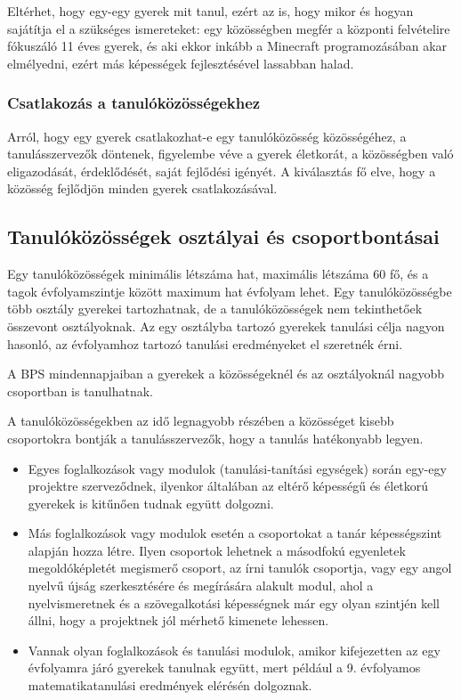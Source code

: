 Eltérhet, hogy egy-egy gyerek mit tanul, ezért az is, hogy mikor és
hogyan sajátítja el a szükséges ismereteket: egy közösségben megfér a
központi felvételire fókuszáló 11 éves gyerek, és aki ekkor inkább a
Mi\-ne\-craft programozásában akar elmélyedni, ezért más képességek
fejlesztésével lassabban halad.

\hypertarget{csatlakozas-a-tanulokozossegekhez}{%
\subsubsection{Csatlakozás a
tanulóközösségekhez}\label{csatlakozas-a-tanulokozossegekhez}}

Arról, hogy egy gyerek csatlakozhat-e egy tanulóközösség közösségéhez, a
tanulásszervezők döntenek, figyelembe véve a gyerek életkorát, a
közösségben való eligazodását, érdeklődését, saját fejlődési igényét. A
kiválasztás fő elve, hogy a közösség fejlődjön minden gyerek
csatlakozásával.

\hypertarget{tanulokozossegek-osztalyai-es-csoportbontasai}{%
\subsection{Tanulóközösségek osztályai és
csoportbontásai}\label{tanulokozossegek-osztalyai-es-csoportbontasai}}

Egy tanulóközösségek minimális létszáma hat, maximális létszáma 60 fő, és
a tagok évfolyamszintje között maximum hat évfolyam lehet. Egy
tanulóközösségbe több osztály gyerekei tartozhatnak, de a
tanulóközösségek nem tekinthetőek összevont osztályoknak. Az egy
osztályba tartozó gyerekek tanulási célja nagyon hasonló, az évfolyamhoz
tartozó tanulási eredményeket el szeretnék érni.

A BPS mindennapjaiban a gyerekek a közösségeknél és az osztályoknál
nagyobb csoportban is tanulhatnak.

A tanulóközösségekben az idő legnagyobb részében a közösséget kisebb
csoportokra bontják a tanulásszervezők, hogy a tanulás hatékonyabb legyen.

\begin{itemize}
\tightlist
\item
  Egyes foglalkozások vagy modulok (tanulási-tanítási egységek) során
  egy-egy projektre szerveződnek, ilyenkor általában az eltérő képességű
  és életkorú gyerekek is kitűnően tudnak együtt dolgozni.
\item
  Más foglalkozások vagy modulok esetén a csoportokat a tanár
  képességszint alapján hozza létre. Ilyen csoportok lehetnek a
  másodfokú egyenletek megoldóképletét megismerő csoport, az írni
  tanulók csoportja, vagy egy angol nyelvű újság szerkesztésére és
  megírására alakult modul, ahol a nyelvismeretnek és a szövegalkotási
  képességnek már egy olyan szintjén kell állni, hogy a projektnek jól
  mérhető kimenete lehessen.
\item
  Vannak olyan foglalkozások és tanulási modulok, amikor kifejezetten az
  egy évfolyamra járó gyerekek tanulnak együtt, mert például a 9.
  évfolyamos matematikatanulási eredmények elérésén dolgoznak.
\end{itemize}

